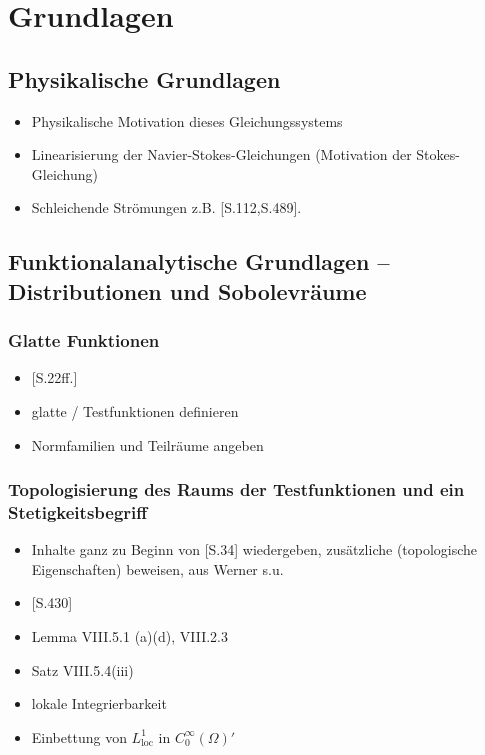 \chapter{Grundlagen}
\label{cp:grundlagen}

\section{Physikalische Grundlagen}

\begin{itemize}
  \item Physikalische Motivation dieses Gleichungssystems
  \item Linearisierung der Navier-Stokes-Gleichungen (Motivation der Stokes-Gleichung)
  \item Schleichende Strömungen z.B. \cite{spurk10stroemungslehre}[S.112,S.489]. 
\end{itemize}

\section{Funktionalanalytische Grundlagen -- Distributionen und Sobolevräume}

\subsection{Glatte Funktionen}

\begin{itemize}
  \item \cite{sohr2001navier}[S.22ff.]
  \item glatte / Testfunktionen definieren
  \item Normfamilien und Teilräume angeben
\end{itemize}

\subsection{Topologisierung des Raums der Testfunktionen und ein Stetigkeitsbegriff}

\begin{itemize}
  \item Inhalte ganz zu Beginn von \cite{sohr2001navier}[S.34] wiedergeben, zusätzliche (topologische Eigenschaften) beweisen, aus Werner s.u.
  \item \cite{werner2011fa}[S.430]
  \item Lemma VIII.5.1 (a)(d), VIII.2.3
  \item Satz VIII.5.4(iii)
  \item lokale Integrierbarkeit
  \item Einbettung von $L^1_{\mathrm{loc}}$ in $C_0^\infty(\Omega)'$
\end{itemize}

